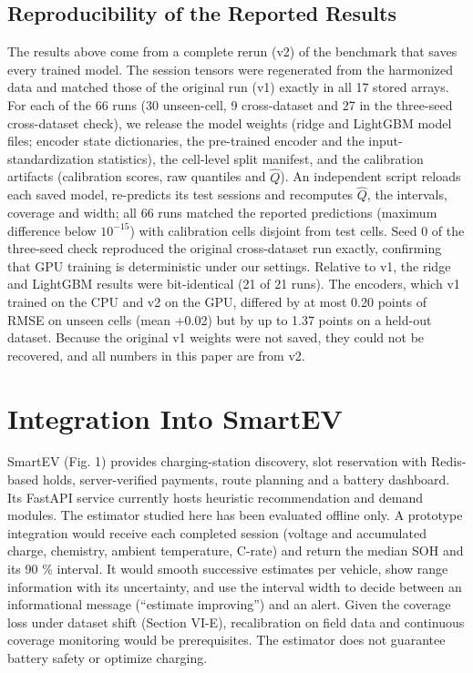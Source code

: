 \documentclass[journal]{IEEEtran}
\begin{document}
\subsection{Reproducibility of the Reported Results}
The results above come from a complete rerun (v2) of the benchmark that saves every trained model. The session tensors were regenerated from the harmonized data and matched those of the original run (v1) exactly in all 17 stored arrays. For each of the 66 runs (30 unseen-cell, 9 cross-dataset and 27 in the three-seed cross-dataset check), we release the model weights (ridge and LightGBM model files; encoder state dictionaries, the pre-trained encoder and the input-standardization statistics), the cell-level split manifest, and the calibration artifacts (calibration scores, raw quantiles and \(\hat{Q}\)). An independent script reloads each saved model, re-predicts its test sessions and recomputes \(\hat{Q}\), the intervals, coverage and width; all 66 runs matched the reported predictions (maximum difference below \(10^{-15}\)) with calibration cells disjoint from test cells. Seed 0 of the three-seed check reproduced the original cross-dataset run exactly, confirming that GPU training is deterministic under our settings. Relative to v1, the ridge and LightGBM results were bit-identical (21 of 21 runs). The encoders, which v1 trained on the CPU and v2 on the GPU, differed by at most 0.20 points of RMSE on unseen cells (mean +0.02) but by up to 1.37 points on a held-out dataset. Because the original v1 weights were not saved, they could not be recovered, and all numbers in this paper are from v2.

\section{Integration Into SmartEV}
SmartEV (Fig. 1) provides charging-station discovery, slot reservation with Redis-based holds, server-verified payments, route planning and a battery dashboard. Its FastAPI service currently hosts heuristic recommendation and demand modules. The estimator studied here has been evaluated offline only. A prototype integration would receive each completed session (voltage and accumulated charge, chemistry, ambient temperature, C-rate) and return the median SOH and its 90 \% interval. It would smooth successive estimates per vehicle, show range information with its uncertainty, and use the interval width to decide between an informational message (``estimate improving'') and an alert. Given the coverage loss under dataset shift (Section VI-E), recalibration on field data and continuous coverage monitoring would be prerequisites. The estimator does not guarantee battery safety or optimize charging.
\end{document}
